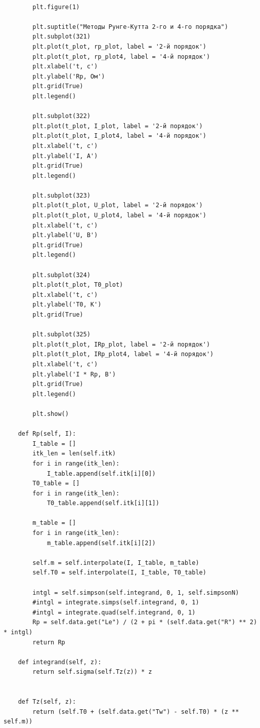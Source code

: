 \documentclass[a4paper,14pt]{article}
\begin{document}
\begin{lstlisting}[label=code1,caption=\text{Класс Modeller.}]
        
        plt.figure(1)

        plt.suptitle("Методы Рунге-Кутта 2-го и 4-го порядка")
        plt.subplot(321)
        plt.plot(t_plot, rp_plot, label = '2-й порядок')
        plt.plot(t_plot, rp_plot4, label = '4-й порядок')
        plt.xlabel('t, с')
        plt.ylabel('Rp, Ом')
        plt.grid(True)
        plt.legend()

        plt.subplot(322)
        plt.plot(t_plot, I_plot, label = '2-й порядок')
        plt.plot(t_plot, I_plot4, label = '4-й порядок')
        plt.xlabel('t, с')
        plt.ylabel('I, А')
        plt.grid(True)
        plt.legend()

        plt.subplot(323)
        plt.plot(t_plot, U_plot, label = '2-й порядок')
        plt.plot(t_plot, U_plot4, label = '4-й порядок')
        plt.xlabel('t, с')
        plt.ylabel('U, В')
        plt.grid(True)
        plt.legend()

        plt.subplot(324)
        plt.plot(t_plot, T0_plot)
        plt.xlabel('t, с')
        plt.ylabel('T0, К')
        plt.grid(True)
        
        plt.subplot(325)
        plt.plot(t_plot, IRp_plot, label = '2-й порядок')
        plt.plot(t_plot, IRp_plot4, label = '4-й порядок')
        plt.xlabel('t, с')
        plt.ylabel('I * Rp, В')
        plt.grid(True)
        plt.legend()

        plt.show()

    def Rp(self, I):
        I_table = []
        itk_len = len(self.itk)
        for i in range(itk_len):
            I_table.append(self.itk[i][0])
        T0_table = []
        for i in range(itk_len):
            T0_table.append(self.itk[i][1])

        m_table = []
        for i in range(itk_len):
            m_table.append(self.itk[i][2])
        
        self.m = self.interpolate(I, I_table, m_table)
        self.T0 = self.interpolate(I, I_table, T0_table)

        intgl = self.simpson(self.integrand, 0, 1, self.simpsonN)
        #intgl = integrate.simps(self.integrand, 0, 1)
        #intgl = integrate.quad(self.integrand, 0, 1)
        Rp = self.data.get("Le") / (2 + pi * (self.data.get("R") ** 2) * intgl)
        return Rp

    def integrand(self, z):
        return self.sigma(self.Tz(z)) * z
        

    def Tz(self, z):
        return (self.T0 + (self.data.get("Tw") - self.T0) * (z ** self.m))
    

\end{lstlisting}
\end{document}
